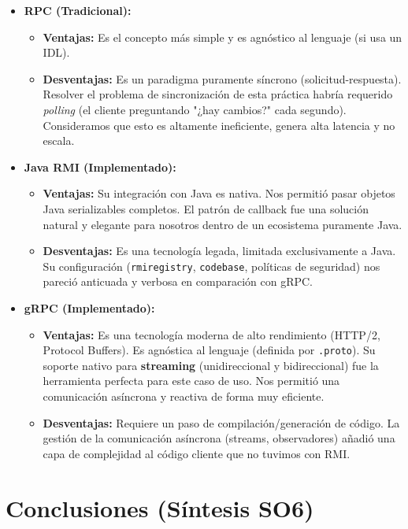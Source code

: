 \documentclass[11pt, a4paper]{article}
\begin{document}
\begin{itemize}
    \item \textbf{RPC (Tradicional):}
    \begin{itemize}
        \item \textbf{Ventajas:} Es el concepto más simple y es agnóstico al lenguaje (si usa un IDL).
\item \textbf{Desventajas:} Es un paradigma puramente síncrono (solicitud-respuesta).
Resolver el problema de sincronización de esta práctica habría requerido \textit{polling} (el cliente preguntando "¿hay cambios?" cada segundo).
Consideramos que esto es altamente ineficiente, genera alta latencia y no escala.
    \end{itemize}
    
    \item \textbf{Java RMI (Implementado):}
    \begin{itemize}
        \item \textbf{Ventajas:} Su integración con Java es nativa.
Nos permitió pasar objetos Java serializables completos. El patrón de callback fue una solución natural y elegante para nosotros dentro de un ecosistema puramente Java.
\item \textbf{Desventajas:} Es una tecnología legada, limitada exclusivamente a Java.
Su configuración (\texttt{rmiregistry}, \texttt{codebase}, políticas de seguridad) nos pareció anticuada y verbosa en comparación con gRPC.
\end{itemize}
    
    \item \textbf{gRPC (Implementado):}
    \begin{itemize}
        \item \textbf{Ventajas:} Es una tecnología moderna de alto rendimiento (HTTP/2, Protocol Buffers).
Es agnóstica al lenguaje (definida por \texttt{.proto}).
Su soporte nativo para \textbf{streaming} (unidireccional y bidireccional) fue la herramienta perfecta para este caso de uso.
Nos permitió una comunicación asíncrona y reactiva de forma muy eficiente.
\item \textbf{Desventajas:} Requiere un paso de compilación/generación de código. La gestión de la comunicación asíncrona (streams, observadores) añadió una capa de complejidad al código cliente que no tuvimos con RMI.
    \end{itemize}
\end{itemize}

\section{Conclusiones (Síntesis SO6)}
\label{sec:conclusiones}
\end{document}
